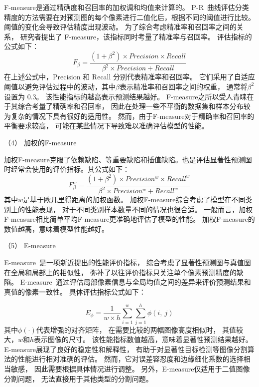 F-measure是通过精确度和召回率的加权调和均值来计算的。
P-R~曲线评估分类精度的方法需要在对预测图的每个像素进行二值化后，根据不同的阈值进行比较。
阈值的变化会导致评估精度出现波动。
为了综合考虑精准率和召回率之间的关系，
研究者提出了 F-measure，该指标同时考量了精准率与召回率。
评估指标的公式如下：
%
%
\begin{equation}
	F_{\beta} = \frac{\left ( 1 + \beta^{2} \right ) \times Precision \times Recall }{\beta^{2} \times Precision + Recall } 
\end{equation}
%
%
在上述公式中，Precision 和 Recall 分别代表精准率和召回率。
它们采用了自适应阈值以避免评估过程中的波动，其中$\beta$表示精准率和召回率之间的权重，
通常将$\beta^{2}$设置为 0.3。
该性能指标的越高表示预测结果越好。
F-measure之所以受人青睐在于其综合考量了精确率和召回率，
因此在处理一些不平衡的数据集和样本分布较为复杂的情况下具有很好的适用性。
然而，由于F-measure对于精确率和召回率的平衡要求较高，
可能在某些情况下导致难以准确评估模型的性能。






（4）
加权的F-measure\par
%
%
加权F-measure克服了依赖缺陷、等重要缺陷和插值缺陷。也是评估显著性预测图时经常会使用的评价指标。其公式如下：
\begin{equation}
	F_{\beta}^{w} = \frac{\left ( 1 + \beta^{2} \right ) \times Precision^{w}  \times Recall^{w} }{\beta^{2} \times Precision^{w} + Recall^{w} } 
\end{equation}
%
%
其中$w$是基于欧几里得距离的加权函数。
加权F-measure综合考虑了模型在不同类别上的性能表现，
对于不同类别样本数量不同的情况也很合适。
一般而言，加权F-measure相比简单平均F-measure更准确地评估了模型的性能。
加权F-measure的数值越高，意味着模型性能越好。







（5）
E-measure\par
%
%
E-measure~是一项新近提出的性能评价指标，
综合考虑了显著性预测图与真值图在全局和局部上的相似性，
弥补了以往评价指标只关注单个像素预测精度的缺陷。
E-measure~通过评估局部像素信息与全局均值之间的差异来评价预测结果和真值的像素一致性。
具体评估指标公式如下：

\begin{equation}
	E_{\phi } = \frac{1}{w \times h} \sum_{i=1}^{w} \sum_{j=1}^{h} \phi\left ( i,~j \right ) 
\end{equation}
%
%
%
%
其中$\phi\left (\cdot \right ) $代表增强的对齐矩阵，
在需要比较的两幅图像高度相似时，
其值较大，$w$和$h$表示图像的尺寸。
该性能指标数值越高，意味着显著性预测结果越好。
E-measure展现了良好的稳定性和解释性，
有助于对显著性目标检测等图像分割算法的性能进行相对准确的评估。
然而，它对误差容忍度和边缘细化系数的选择相当敏感，
因此需要根据具体情况进行调整。
另外，E-measure仅适用于二值图像分割问题，
无法直接用于其他类型的分割问题。



